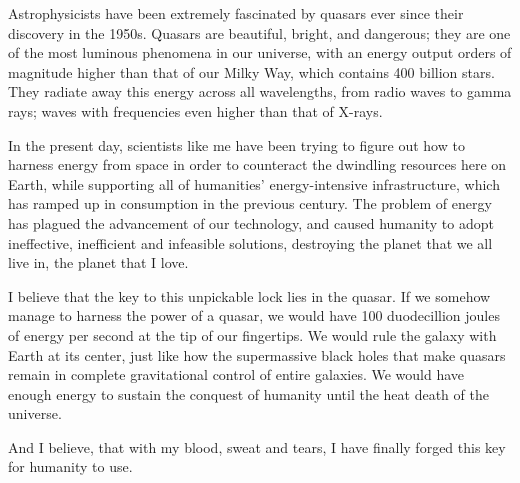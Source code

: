 \documentclass{book}
\begin{document}
			Astrophysicists have been extremely fascinated by quasars ever since their discovery in
			the 1950s. Quasars are beautiful, bright, and dangerous; they are one of the most
			luminous phenomena in our universe, with an energy output orders of magnitude higher
			than that of our Milky Way, which contains 400 billion stars. They radiate away this
			energy across all wavelengths, from radio waves to gamma rays; waves with frequencies
			even higher than that of X-rays.

			In the present day, scientists like me have been trying to figure out how to harness
			energy from space in order to counteract the dwindling resources here on Earth, while
			supporting all of humanities' energy-intensive infrastructure, which has ramped up in
			consumption in the previous century. The problem of energy has plagued the advancement
			of our technology, and caused humanity to adopt ineffective, inefficient and infeasible
			solutions, destroying the planet that we all live in, the planet that I love.

			I believe that the key to this unpickable lock lies in the quasar. If we somehow manage
			to harness the power of a quasar, we would have 100 duodecillion joules of energy per
			second at the tip of our fingertips. We would rule the galaxy with Earth at its center,
			just like how the supermassive black holes that make quasars remain in complete
			gravitational control of entire galaxies. We would have enough energy to sustain the
			conquest of humanity until the heat death of the universe.

			And I believe, that with my blood, sweat and tears, I have finally forged this key for
			humanity to use.
\end{document}
